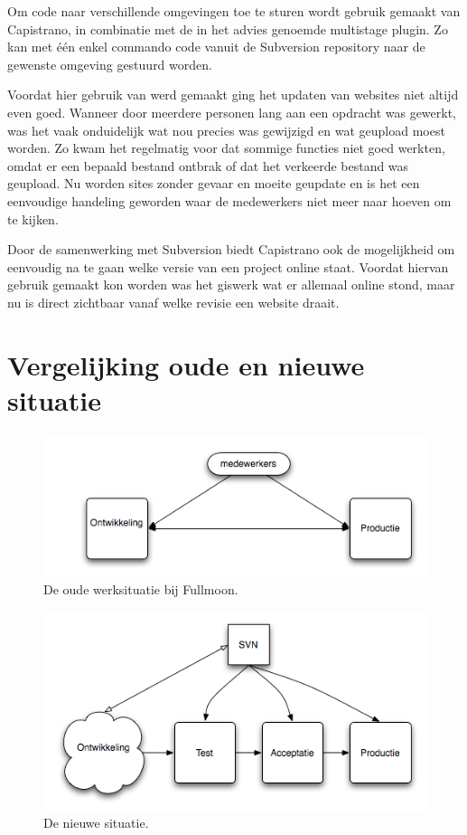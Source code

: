 Om code naar verschillende omgevingen toe te sturen wordt gebruik gemaakt van Capistrano, in combinatie met de in het advies genoemde multistage plugin. Zo kan met één enkel commando code vanuit de Subversion repository naar de gewenste omgeving gestuurd worden.

Voordat hier gebruik van werd gemaakt ging het updaten van websites niet altijd even goed. Wanneer door meerdere personen lang aan een opdracht was gewerkt, was het vaak onduidelijk wat nou precies was gewijzigd en wat geupload moest worden. Zo kwam het regelmatig voor dat sommige functies niet goed werkten, omdat er een bepaald bestand ontbrak of dat het verkeerde bestand was geupload. Nu worden sites zonder gevaar en moeite geupdate en is het een eenvoudige handeling geworden waar de medewerkers niet meer naar hoeven om te kijken.

Door de samenwerking met Subversion biedt Capistrano ook de mogelijkheid om eenvoudig na te gaan welke versie van een project online staat. Voordat hiervan gebruik gemaakt kon worden was het giswerk wat er allemaal online stond, maar nu is direct zichtbaar vanaf welke revisie een website draait. 

\section{Vergelijking oude en nieuwe situatie}

\begin{figure}[H]
  \centering
  \includegraphics[scale=0.70]{situatie_oud.png}
  \caption[Oude situatie.]{De oude werksituatie bij Fullmoon.}
\end{figure}

\begin{figure}
  \centering
  \includegraphics[scale=0.70]{situatie_nieuw.png}
  \caption[Nieuwe situatie.]{De nieuwe situatie.}
\end{figure}


